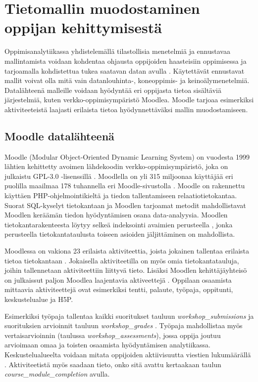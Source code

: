 \color{black}
\chapter{Tietomallin muodostaminen oppijan kehittymisestä\label{luku3}}

Oppimisanalytiikassa yhdistelemällä tilastollisia menetelmiä ja ennustavaa mallintamista voidaan kohdentaa ohjausta oppijoiden haasteisiin oppimisessa ja tarjoamalla kohdistettua tukea saatavan datan avulla \citep{ranjeethSurveyPredictiveModels2020}. Käytettävät ennustavat mallit voivat olla mitä vain datanlouhinta-, koneoppimis- ja keinoälymenetelmiä. Datalähteenä malleille voidaan hyödyntää eri oppijasta tietoa sisältäviä järjestelmiä, kuten verkko-oppimisympäristö Moodlea. Moodle tarjoaa esimerkiksi aktiviteeteistä laajasti erilaista tietoa hyödynnettäväksi mallin muodostamiseen.

\section{Moodle datalähteenä}

Moodle (Modular Object-Oriented Dynamic Learning System) on vuodesta 1999 lähtien kehittetty avoimen lähdekoodin verkko-oppimisympäristö, joka on julkaistu GPL-3.0 -lisenssillä \citep{dougiamasPowerOpenEducational2021,dougiamasMoodle2022}. Moodlella on yli 315 miljoonaa käyttäjää eri puolilla maailmaa 178 tuhannella eri Moodle-sivustolla \citep{moodle.orgMoodleStatistics}. Moodle on rakennettu käyttäen PHP-ohjelmointikieltä ja tiedon tallentamiseen relaatiotietokantaa. Suorat SQL-kyselyt tietokantaan ja Moodlen tarjoamat metodit mahdollistavat Moodlen keräämän tiedon hyödyntämisen osana data-analyysia. Moodlen tietokantarakenteesta löytyy selkeä indeksointi avaimien perusteella \citep{greenMoodle11Database2022}, jonka perusteella tietokantataulusta toiseen asioiden jäljittäminen on mahdollista.

Moodlessa on vakiona 23 erilaista aktiviteettia, joista jokainen tallentaa erilaista tietoa tietokantaan \citep{dougiamasMoodle2022}. Jokaisella aktiviteetilla on myös omia tietokantatauluja, joihin tallennetaan aktiviteettiin liittyvä tieto. Lisäksi Moodlen kehittäjäyhteisö on julkaissut paljon Moodlea laajentavia aktiveettejä \citep{moodle.orgMoodlePluginsDirectory2022}. Oppilaan osaamista mittaavia aktiviteettejä ovat esimerkiksi tentti, palaute, työpaja, oppitunti, keskustelualue ja H5P.

Esimerkiksi työpaja tallentaa kaikki suoritukset tauluun \emph{workshop\_submissions} ja suorituksien arvioinnit tauluun \emph{workshop\_grades} \citep{greenMoodle11Database2022}. Työpaja mahdollistaa myös vertaisarvioinnin (taulussa \emph{workshop\_assessments}), jossa oppija joutuu arvioimaan omaa ja toisten osaamista hyödyntämisen analytiikassa. Keskustelualueelta voidaan mitata oppijoiden aktiivisuutta viestien lukumäärällä \citep{mwalumbweUsingLearningAnalytics2017}. Aktiviteetistä myös saadaan tieto, onko sitä avattu kertaakaan taulun \emph{course\_module\_completion} avulla.

